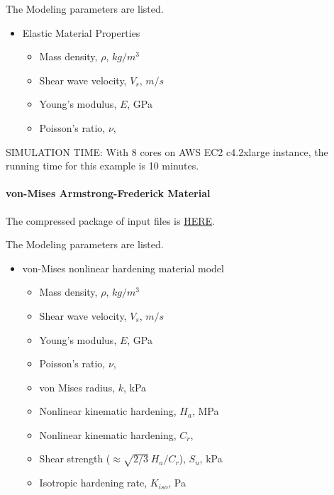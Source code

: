The Modeling parameters are listed.
\begin{itemize}
  \item Elastic Material Properties 
  \begin{itemize}
    \item Mass density, $\rho$, \enspace {} $kg/m^3$
    \item Shear wave velocity, $V_s$, \enspace {} $m/s$
    \item Young's modulus, $E$, \enspace {} GPa
    \item Poisson's ratio, $\nu$, \enspace {}
  \end{itemize}
\end{itemize}


SIMULATION TIME: With 8 cores on AWS EC2 c4.2xlarge instance, the running time for this example is 10 minutes.

\paragraph{von-Mises Armstrong-Frederick Material}
The compressed package of input files is  
\href{http://sokocalo.engr.ucdavis.edu/~jeremic/Real_ESSI_Simulator/Real_ESSI_Short_Course_Examples_Dec2017/short-course-examples/nonlinear_analysis_steps/soil-structure/vonMisesArmstrongFrederick/_all_files_packaged_for_vonMisesArmstrongFrederick.tar.gz}{HERE}. 


The Modeling parameters are listed.
\begin{itemize}
  \item von-Mises nonlinear hardening material model 
  \begin{itemize}
    \item Mass density, $\rho$, \enspace {} $kg/m^3$
    \item Shear wave velocity, $V_s$, \enspace {} $m/s$
    \item Young's modulus, $E$, \enspace {} GPa
    \item Poisson's ratio, $\nu$, \enspace {}
    \item von Mises radius, $k$, \enspace {} kPa
    \item Nonlinear kinematic hardening, $H_a$, \enspace {} MPa
    \item Nonlinear kinematic hardening, $C_r$, \enspace {}
    \item Shear strength ($\approx \sqrt{2/3}\ {H_a/C_r} $), $S_u$, \enspace {} kPa
    \item Isotropic hardening rate, $K_{iso}$, \enspace {} Pa
  \end{itemize}
\end{itemize}


